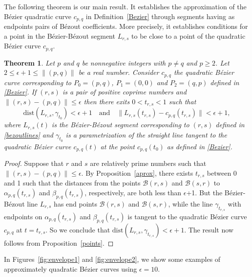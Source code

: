\documentclass[12pt,english]{article}
\newcommand{\B}{\mathcal B}
\newtheorem{theorem}{Theorem}[section]
\begin{document}
The following theorem is our main result. It establishes the approximation of the B\'ezier quadratic curve $c_{p,q}$  in Definition~\ref{Bezier} through segments having as endpoints pairs of B\'ezout coefficients. More precisely, it establishes conditions for a point in  the  B\'ezier-B\'ezout segment  $L_{r,s}$ to be close to a point of the quadratic B\'ezier  curve $c_{p,q}$.



\begin{theorem}\label{main}
 Let $p$ and $q$ be nonnegative integers with $p\not=q$ and $p\geq 2$. 
  Let  $2\leq  \epsilon+1\leq  \|(p,q)\|$ be a real number. Consider $c_{p,q}$ the quadratic B\'ezier curve corresponding to $P_0=(p,q)$, $P_1=(0,0)$ and $P_2=(q,p)$ defined in \ref{Bezier}. If $(r,s)$ is a pair of positive coprime numbers and   $\|(r,s)-(p,q)\|\leq \epsilon$  then there exits $0< t_{r,s}< 1$  such that %
 \begin{equation*}
   \mathrm{dist}(L_{r,s},\gamma_{t_0})<\epsilon+1 \quad\text{and}\quad\|L_{r,s}(t_{r,s})- c_{p,q}(t_{r,s})\|<\epsilon+1,
 \end{equation*}
where $L_{r,s}(t)$ is the B\'ezier-B\'ezout segment corresponding to $(r,s)$ defined in \ref{bezoutlines} and $\gamma_{t_0}$ is a parametrization of the straight line tangent to the quadratic B\'ezier curve  $c_{p,q}(t)$ at the point $c_{p,q}(t_0)$ as defined in \ref{Bezier}.

\end{theorem}
\begin{proof}
    Suppose that $r$ and $s$ are relatively prime numbers such that $\| (r,s)-(p,q)\|\leq \epsilon$. By Proposition~\ref{aprox}, there exists $t_{r,s}$ between 0 and 1 such that the distances from the points $\B(r,s)$ and $\B(s,r)$ to $\alpha_{p,q}(t_{r,s})$ and $\beta_{p,q}(t_{r,s})$, respectively, are both less than $\epsilon$+1. But the B\'ezier-B\'ezout line $L_{r,s}$ has end points $\B(r,s)$ and $\B(s,r)$, while the line $\gamma_{t_{r,s}}$ with endpoints on $\alpha_{p,q}(t_{r,s})$ and $\beta_{p,q}(t_{r,s})$ is tangent to the quadratic B\'ezier curve $c_{p,q}$ at $t=t_{r,s}$. So we conclude that $\mathrm{dist}(L_{r,s},\gamma_{t_{r,s}})<\epsilon+1$. The result now follows from Proposition~\ref{points}.
\end{proof}

In Figures~\ref{fig:envelope1} and \ref{fig:envelope2}, we show  some examples of approximately quadratic B\'ezier curves using $\epsilon=10$. 
\end{document}
